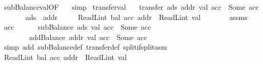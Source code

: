 \begin{isabellebody}
\ subBalance{\isacharunderscore}{\kern0pt}val{}{\isacharbrackleft}{\kern0pt}OF\ {\isacharasterisk}{\kern0pt}{\isacharbrackright}{\kern0pt}\ \isamarkupfalse%
\ simp\isanewline
{}\isamarkupfalse%
%
\endisatagproof
{\isafoldproof}%
%
\isadelimproof
\isanewline
%
\endisadelimproof
\isanewline
{}\isamarkupfalse%
\ transfer{\isacharunderscore}{\kern0pt}val{}{\isacharcolon}{\kern0pt}\isanewline
\ \ \ {\isachardoublequoteopen}transfer\ ads\ addr\ val\ acc\ {\isacharequal}{\kern0pt}\ Some\ acc{\isacharprime}{\kern0pt}{\isachardoublequoteclose}\isanewline
\ \ \ \ \ \ \ {\isachardoublequoteopen}ads\ {\isasymnoteq}\ addr{\isachardoublequoteclose}\isanewline
\ \ \ \ \ {\isachardoublequoteopen}ReadL\isactrlsub i\isactrlsub n\isactrlsub t\ {\isacharparenleft}{\kern0pt}bal\ {\isacharparenleft}{\kern0pt}acc\ addr{\isacharparenright}{\kern0pt}{\isacharparenright}{\kern0pt}\ {\isacharplus}{\kern0pt}\ ReadL\isactrlsub i\isactrlsub n\isactrlsub t\ val\ {\isacharless}{\kern0pt}\ {}{\isacharcircum}{\kern0pt}{}{}{}{\isachardoublequoteclose}\isanewline
%
\isadelimproof
%
\endisadelimproof
%
\isatagproof
{}\isamarkupfalse%
\ {\isacharminus}{\kern0pt}\isanewline
\ \ \isamarkupfalse%
\ assms{\isacharparenleft}{\kern0pt}{}{\isacharparenright}{\kern0pt}\ \isamarkupfalse%
\ acc{\isacharprime}{\kern0pt}{\isacharprime}{\kern0pt}\isanewline
\ \ \ \ \ {\isacharasterisk}{\kern0pt}{\isacharcolon}{\kern0pt}\ {\isachardoublequoteopen}subBalance\ ads\ val\ acc\ {\isacharequal}{\kern0pt}\ Some\ acc{\isacharprime}{\kern0pt}{\isacharprime}{\kern0pt}{\isachardoublequoteclose}\isanewline
\ \ \ \ \ \ \ {\isacharasterisk}{\kern0pt}{\isacharasterisk}{\kern0pt}{\isacharcolon}{\kern0pt}\ {\isachardoublequoteopen}addBalance\ addr\ val\ acc{\isacharprime}{\kern0pt}{\isacharprime}{\kern0pt}\ {\isacharequal}{\kern0pt}\ Some\ acc{\isacharprime}{\kern0pt}{\isachardoublequoteclose}\ \isamarkupfalse%
\ {\isacharparenleft}{\kern0pt}simp\ add{\isacharcolon}{\kern0pt}\ subBalance{\isacharunderscore}{\kern0pt}def\ transfer{\isacharunderscore}{\kern0pt}def\ split{\isacharcolon}{\kern0pt}if{\isacharunderscore}{\kern0pt}split{\isacharunderscore}{\kern0pt}asm{\isacharparenright}{\kern0pt}\isanewline
\isanewline
\ \ \isamarkupfalse%
\ {\isachardoublequoteopen}ReadL\isactrlsub i\isactrlsub n\isactrlsub t\ {\isacharparenleft}{\kern0pt}bal\ {\isacharparenleft}{\kern0pt}acc{\isacharprime}{\kern0pt}{\isacharprime}{\kern0pt}\ addr{\isacharparenright}{\kern0pt}{\isacharparenright}{\kern0pt}\ {\isacharplus}{\kern0pt}\ ReadL\isactrlsub i\isactrlsub n\isactrlsub t\ val\ {\isacharless}{\kern0pt}\ {}{\isacharcircum}{\kern0pt}{}{}{}{\isachardoublequoteclose}\ \isamarkupfalse%

\end{isabellebody}
